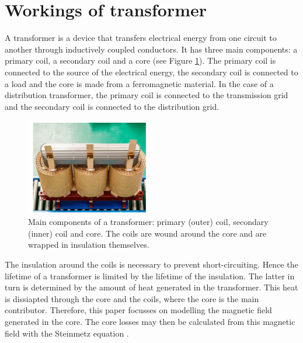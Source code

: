 \section{Workings of transformer}
A transformer is a device that transfers electrical energy from one circuit to another through inductively coupled conductors. 
It has three main components: a primary coil, a secondary coil and a core (see Figure \ref{fig:transformercore}). 
The primary coil is connected to the source of the electrical energy, the secondary coil is connected to a load and the core is made from a ferromagnetic material.
In the case of a distribution transformer, the primary coil is connected to the transmission grid and the secondary coil is connected to the distribution grid.
\begin{figure}[H]
    \centering
    \includegraphics[width=0.5\textwidth]{img/transformercore.png}
    \caption{Main components of a transformer: primary (outer) coil, secondary (inner) coil and core. The coils are wound around the core
    and are wrapped in insulation themselves.}
    \label{fig:transformercore}
\end{figure}

The insulation around the coils is necessary to prevent short-circuiting. Hence the lifetime of a transformer is limited by the lifetime of the insulation.
The latter in turn is determined by the amount of heat generated in the transformer. This heat is dissiapted through the core and the coils, where the core is the main contributor.
Therefore, this paper focusses on modelling the magnetic field generated in the core. The core losses may then be calculated from this magnetic field with the Steinmetz equation \cite{steinmetzEq} 
\cite{vanDijk2022}.

